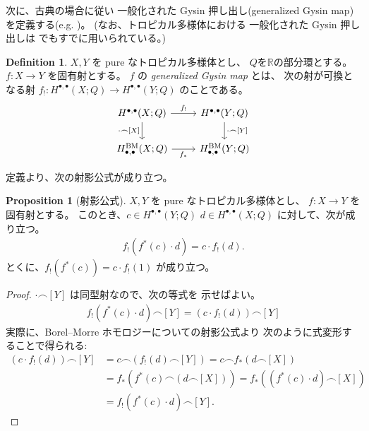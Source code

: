\documentclass[a4paper,dvipdfmx,reqno,12pt]{amsart}
\theoremstyle{definition}
\newtheorem{definition}[theorem]{Definition}
\newtheorem{proposition}[theorem]{Proposition}
\numberwithin{equation}{section}
\begin{document}
次に、古典の場合に従い
一般化された Gysin 押し出し(generalized Gysin map)
を定義する(e.g. 
\cite[Chapter 13. Appendix]{MR2810322})。
(なお、トロピカル多様体における
一般化された Gysin 押し出しは
\cite[Proposition 8.3]{amini2020hodge} でもすでに用いられている。)
\begin{definition}
$X,Y$ を pure なトロピカル多様体とし、
$Q$を$\mathbb{R}$の部分環とする。
$f\colon X\to Y$ を固有射とする。
$f$ の \emph{generalized Gysin map} とは、
次の射が可換となる射
$f_!\colon H^{\bullet,\bullet}(X;Q)\to 
H^{\bullet,\bullet}(Y;Q)$
のことである。
\begin{equation}
\begin{tikzcd}
	{H^{\bullet,\bullet}(X;Q)} & {H^{\bullet,\bullet}(Y;Q)} \\
	{H_{\bullet,\bullet}^{\mathrm{BM}}(X;Q)} & {H_{\bullet,\bullet}^{\mathrm{BM}}(Y;Q)}
	\arrow["{\cdot \frown [X]}"', from=1-1, to=2-1]
	\arrow["{\cdot\frown[Y]}", from=1-2, to=2-2]
	\arrow["{f_*}"', from=2-1, to=2-2]
	\arrow["{f_!}", from=1-1, to=1-2]
\end{tikzcd}    
\end{equation}

\end{definition}
定義より、次の射影公式が成り立つ。
\begin{proposition}[{射影公式}]
$X,Y$ を pure なトロピカル多様体とし、
$f\colon X\to Y$ を固有射とする。
このとき、$c\in H^{\bullet,\bullet}(Y;Q) $
$d\in H^{\bullet,\bullet}(X;Q)$
に対して、次が成り立つ。
\begin{align}
    f_!(f^{*}(c)\cdot d)=c\cdot f_!(d).
\end{align}
とくに、$f_!(f^{*}(c))=c\cdot f_!(1)$ が成り立つ。
\end{proposition}

\begin{proof}
$\cdot \frown [Y]$ は同型射なので、次の等式を
示せばよい。
\begin{align}
    f_!(f^{*}(c)\cdot d)\frown [Y]=(c\cdot f_!(d))\frown [Y]
\end{align}
実際に、Borel--Morre ホモロジーについての射影公式より
次のように式変形することで得られる:
\begin{align}
(c\cdot f_!(d))\frown [Y]&=
c\frown(f_!(d)\frown [Y])=
c\frown f_*(d\frown [X])\\
&=f_*(f^*(c)\frown (d\frown [X]))
=f_*((f^*(c)\cdot d) \frown [X]) \\
&=f_!(f^{*}(c)\cdot d)\frown [Y].
\end{align}
\end{proof}
\end{document}
